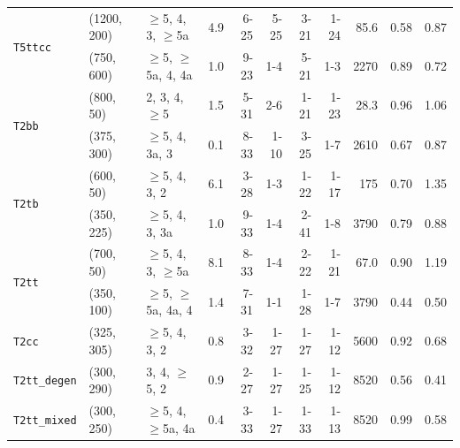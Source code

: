 \begin{table}[!t]
\begin{tabular}{ lllcrrrrrcc }
    \multirow{2}{*}{\texttt{T5ttcc}}  
  & (1200, 200) & $\geq$5, 4, 3, $\geq$5a  & \phantom{1}4.9 & 6-25  & 5-25    & 3-21  & 1-24 & 85.6 & 0.58 & 0.87 \\
  & (750, 600)  & $\geq$5, $\geq$5a, 4, 4a & \phantom{1}1.0 & 9-23  & 1-4     & 5-21  & 1-3  & 2270 & 0.89 & 0.72 \\ [0.5ex]
    \multirow{2}{*}{\texttt{T2bb}}
  & (800, 50)   & 2, 3, 4, $\geq$5         & \phantom{1}1.5 & 5-31  & 2-6     & 1-21  & 1-23 & 28.3 & 0.96 & 1.06 \\
  & (375, 300)  & $\geq$5, 4, 3a, 3        & \phantom{1}0.1 & 8-33  & 1-10    & 3-25  & 1-7  & 2610 & 0.67 & 0.87 \\ [0.5ex]
    \multirow{2}{*}{\texttt{T2tb}}
  & (600, 50)   & $\geq$5, 4, 3, 2         & \phantom{1}6.1 & 3-28  & 1-3     & 1-22  & 1-17 & 175  & 0.70 & 1.35 \\
  & (350, 225)  & $\geq$5, 4, 3, 3a        & \phantom{1}1.0 & 9-33  & 1-4     & 2-41  & 1-8  & 3790 & 0.79 & 0.88 \\ [0.5ex]
    \multirow{2}{*}{\texttt{T2tt}}
  & (700, 50)   & $\geq$5, 4, 3, $\geq$5a  & \phantom{1}8.1 & 8-33  & 1-4     & 2-22  & 1-21 & 67.0 & 0.90 & 1.19 \\
  & (350, 100)  & $\geq$5, $\geq$5a, 4a, 4 & \phantom{1}1.4 & 7-31  & 1-1     & 1-28  & 1-7  & 3790 & 0.44 & 0.50 \\ [0.5ex]
    \multirow{1}{*}{\texttt{T2cc}}
  & (325, 305)  & $\geq$5, 4, 3, 2         & \phantom{1}0.8 & 3-32  & 1-27    & 1-27  & 1-12 & 5600 & 0.92 & 0.68 \\ [0.5ex]
    \multirow{1}{*}{\texttt{T2tt\_degen}}
  & (300, 290)  & 3, 4, $\geq$5, 2         & \phantom{1}0.9 & 2-27  & 1-27    & 1-25  & 1-12 & 8520 & 0.56 & 0.41 \\ [0.5ex]
    \multirow{1}{*}{\texttt{T2tt\_mixed}}
  & (300, 250)  & $\geq$5, 4, $\geq$5a, 4a & \phantom{1}0.4 & 3-33  & 1-27    & 1-33  & 1-13 & 8520 & 0.99 & 0.58 \\ [0.5ex]
    \hline
  \end{tabular}
\end{table}

